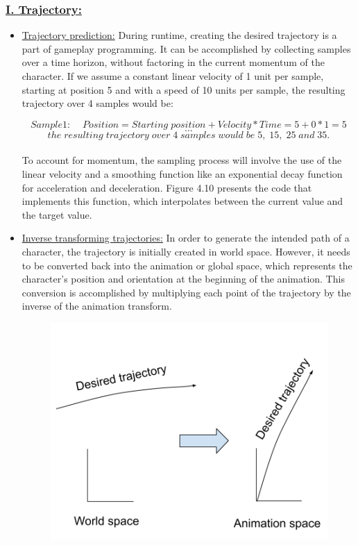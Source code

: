\documentclass[12pt]{book}
\begin{document}
\subsubsection{\underline{\textbf{I. Trajectory:}}}
\begin{itemize}
    \item \underline{Trajectory prediction:}
          During runtime, creating the desired trajectory is a part of gameplay programming. It can be accomplished by collecting samples over a time horizon, without factoring in the current momentum of the character.
          If we assume a constant linear velocity of 1 unit per sample, starting at position 5 and with a speed of 10 units per sample, the resulting trajectory over 4 samples would be:
          
          $$
              Sample 1:\;\;\;\;Position = Starting \;position + Velocity * Time = 5 + 0 * 1 = 5$$
          $$...$$
          $$  the \;resulting \;trajectory \;over \;4 \;samples \;would \;be \;5, \;15, \;25 \;and \;35.
          $$\\
          To account for momentum, the sampling process will involve the use of the linear velocity
          and a smoothing function like an exponential decay function for acceleration and deceleration.
          Figure 4.10 presents the code that implements this function, which interpolates between the
          current value and the target value.
    \item \underline{Inverse transforming trajectories:}
          In order to generate the intended path of a character, the trajectory is initially created in
          world space. However, it needs to be converted back into the animation or global space, which
          represents the character’s position and orientation at the beginning of the animation. This
          conversion is accomplished by multiplying each point of the trajectory by the inverse of the
          animation transform.
          \begin{figure}[!h]
              \centering
              \includegraphics[scale=0.5]{./Figures/Images/InverTT.jpg}

\end{figure}
\end{itemize}
\end{document}
